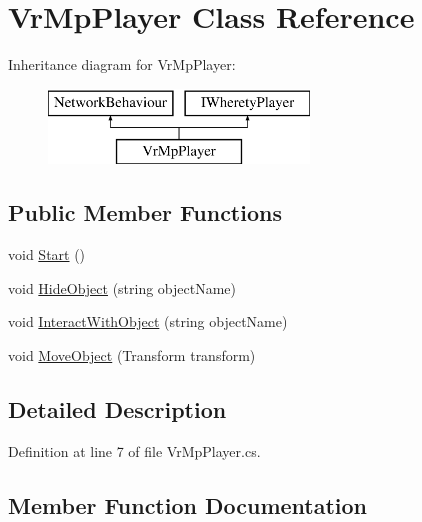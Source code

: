 \hypertarget{class_vr_mp_player}{}\section{Vr\+Mp\+Player Class Reference}
\label{class_vr_mp_player}
Inheritance diagram for Vr\+Mp\+Player\+:\begin{figure}[H]
\begin{center}
\leavevmode
\includegraphics[height=2.000000cm]{class_vr_mp_player}
\end{center}
\end{figure}
\subsection*{Public Member Functions}
\begin{DoxyCompactItemize}
\item 
void \mbox{\hyperlink{class_vr_mp_player_ac5ce52a2494308d5d8a7edc6e6e6f5d3}{Start}} ()
\item 
void \mbox{\hyperlink{class_vr_mp_player_ac7a68dbb6ad184acc78e74a1b063a8d1}{Hide\+Object}} (string object\+Name)
\item 
void \mbox{\hyperlink{class_vr_mp_player_ac9b33feaa74e06413371cd9dbced5530}{Interact\+With\+Object}} (string object\+Name)
\item 
void \mbox{\hyperlink{class_vr_mp_player_a4f5c36d5a2629d9300f4aec04803e8f3}{Move\+Object}} (Transform transform)
\end{DoxyCompactItemize}


\subsection{Detailed Description}


Definition at line 7 of file Vr\+Mp\+Player.\+cs.



\subsection{Member Function Documentation}
\mbox{\label{class_vr_mp_player_ac7a68dbb6ad184acc78e74a1b063a8d1}} 
